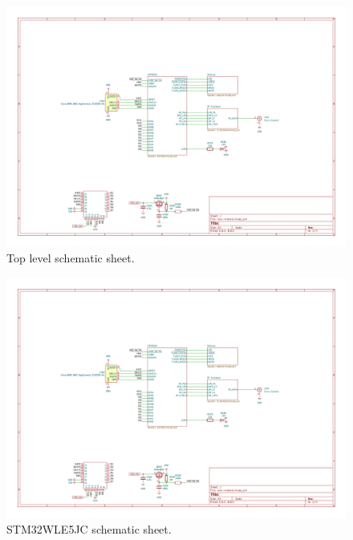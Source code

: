 \begin{figure}
    \includegraphics[page=1,angle=-90,width=\textwidth]{boards/v0.1/lora-module.pdf}
    \caption{\label{schematic:v0.1-1}Top level schematic sheet.}
\end{figure}
\begin{figure}
    \includegraphics[page=2,angle=-90,width=\textwidth]{boards/v0.1/lora-module.pdf}
    \caption{\label{schematic:v0.1-2}STM32WLE5JC schematic sheet.}
\end{figure}
